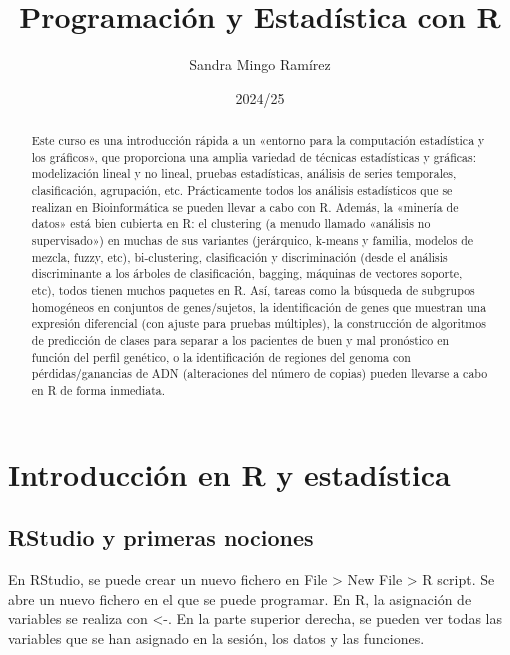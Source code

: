 \documentclass{config/apuntes}\usepackage[]{graphicx}\usepackage[]{xcolor}
\title{Programación y Estadística con R}
\author{Sandra Mingo Ramírez}
\date{2024/25}
\begin{document}
\begin{abstract}
Este curso es una introducción rápida a un «entorno para la computación estadística y los gráficos», que proporciona una amplia variedad de técnicas estadísticas y gráficas: modelización lineal y no lineal, pruebas estadísticas, análisis de series temporales, clasificación, agrupación, etc. Prácticamente todos los análisis estadísticos que se realizan en Bioinformática se pueden llevar a cabo con R. Además, la «minería de datos» está bien cubierta en R: el clustering (a menudo llamado «análisis no supervisado») en muchas de sus variantes (jerárquico, k-means y familia, modelos de mezcla, fuzzy, etc), bi-clustering, clasificación y discriminación (desde el análisis discriminante a los árboles de clasificación, bagging, máquinas de vectores soporte, etc), todos tienen muchos paquetes en R. Así, tareas como la búsqueda de subgrupos homogéneos en conjuntos de genes/sujetos, la identificación de genes que muestran una expresión diferencial (con ajuste para pruebas múltiples), la construcción de algoritmos de predicción de clases para separar a los pacientes de buen y mal pronóstico en función del perfil genético, o la identificación de regiones del genoma con pérdidas/ganancias de ADN (alteraciones del número de copias) pueden llevarse a cabo en R de forma inmediata.
\end{abstract}

\pagestyle{plain}

\maketitle

\tableofcontents




\chapter{Introducción en R y estadística}
\section{RStudio y primeras nociones}
En RStudio, se puede crear un nuevo fichero en File > New File > R script. Se abre un nuevo fichero en el que se puede programar. En R, la asignación de variables se realiza con <-. En la parte superior derecha, se pueden ver todas las variables que se han asignado en la sesión, los datos y las funciones.
\end{document}
